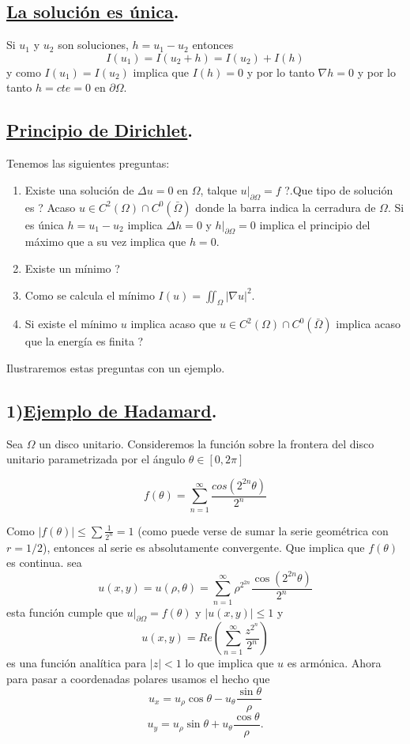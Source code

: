 \documentclass[a4paper,10pt]{book}
\begin{document}
\subsection*{\underline{La soluci\'on es \'unica}.}

Si $u_1$ y $u_2$ son soluciones, $h=u_1-u_2$ entonces
\[I(u_1)=I(u_2+h)=I(u_2)+I(h)\]
y como $I(u_1)=I(u_2)$ implica que $I(h)=0$ y por lo tanto $\nabla h=0$ y por lo tanto 
$h=cte=0$ en $\partial \Omega$.

\subsection*{\underline{Principio de Dirichlet}.}
Tenemos las siguientes preguntas:
\begin{enumerate}
 \item \textquestiondown Existe una soluci\'on de $\Delta u=0$ 
en $\Omega$, talque $u|_{\partial \Omega}=f$ ?.\textquestiondown Que tipo de solución es ?
Acaso $u\in C^2 (\Omega) \cap C^0 (\bar{\Omega})$ donde la barra indica la cerradura de $\Omega$.
Si es \'unica  $h=u_1-u_2$ implica $\Delta h=0$ y $h|_{\partial \Omega} =0$ implica el principio
del m\'aximo que a su vez implica que $h=0$.

\item \textquestiondown Existe un m\'inimo ?
\item \textquestiondown Como se calcula el m\'inimo $I(u)=\iint_{\Omega}  |\nabla u|^2 $.
\item Si existe el m\'inimo $u$ implica acaso que $u\in C^2 (\Omega) \cap C^0 (\bar{\Omega})$ implica 
acaso que la energ\'ia es finita ?
\end{enumerate}

Ilustraremos estas preguntas con un ejemplo. 

\subsection*{1)\underline{Ejemplo de Hadamard}.}

Sea $\Omega $ un disco unitario. Consideremos la funci\'on sobre la frontera del 
disco unitario parametrizada por el \'angulo $\theta\in [0,2\pi]$

\begin{equation}
\label{hadamard}
  f(\theta)=\sum\limits_{n=1}^{\infty} \frac{cos(2^{2n} \theta)}{2^n}
\end{equation}

Como $|f(\theta)|\leq \sum\limits \frac{1}{2^n} =1$ (como puede verse de sumar la serie geom\'etrica con $r=1/2$),
entonces al serie es absolutamente convergente. Que implica que $f(\theta)$ es continua.
sea 
\[u(x,y)=u(\rho,\theta)=\sum\limits_{n=1}^{\infty}  \rho ^{2 ^{2n} } \frac{\cos(2^{2n} \theta)}{2^n}\]
esta funci\'on cumple que $u|_{\partial \Omega}=f(\theta)$  y $|u(x,y)|\leq 1$ y
\[u(x,y)= Re \left( \sum\limits_{n=1}^\infty \frac{z^{2^{n}} }{2^n}\right) \]
es una funci\'on anal\'itica para $|z|<1$  lo que implica que $u$ es arm\'onica. Ahora para pasar a coordenadas
polares usamos el hecho que 
\[u_x=u_\rho \cos \theta - u_{\theta} \frac{\sin \theta}{\rho} \]
\[u_y=u_\rho \sin \theta  + u_{\theta} \frac{\cos \theta}{\rho}.\]
\end{document}
